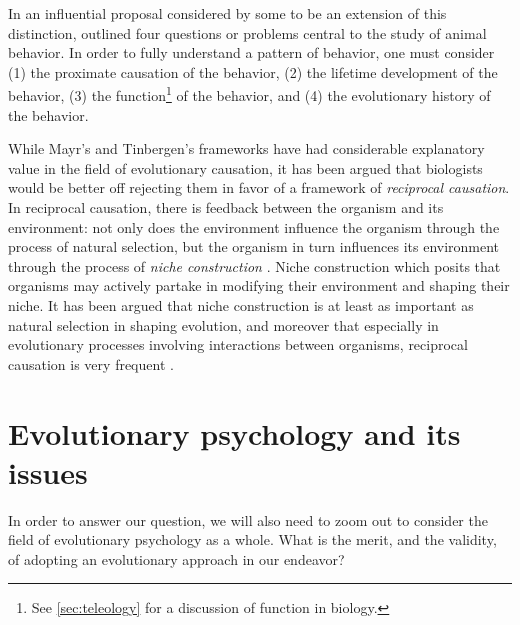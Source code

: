 In an influential proposal considered by some to be an extension of this distinction, \citet{Tinbergen63} outlined four questions or problems central to the study of animal behavior. In order to fully understand a pattern of behavior, one must consider (1) the proximate causation of the behavior, (2) the lifetime development of the behavior, (3) the function\footnote{See \cref{sec:teleology} for a discussion of function in biology.} of the behavior, and (4) the evolutionary history of the behavior.

While Mayr's and Tinbergen's frameworks have had considerable explanatory value in the field of evolutionary causation, it has been argued \citep{Laland13} that biologists would be better off rejecting them in favor of a framework of \emph{reciprocal causation}.
In reciprocal causation, there is feedback between the organism and its environment: not only does the environment influence the organism through the process of natural selection, but the organism in turn influences its environment through the process of \emph{niche construction} \citep{Svensson18}.
Niche construction which posits that organisms may actively partake in modifying their environment and shaping their niche. It has been argued that niche construction is at least as important as natural selection in shaping evolution, and moreover that especially in evolutionary processes involving interactions between organisms, reciprocal causation is very frequent \citep{Svensson18}.

\section{Evolutionary psychology and its issues}

In order to answer our question, we will also need to zoom out to consider the field of evolutionary psychology as a whole. What is the merit, and the validity, of adopting an evolutionary approach in our endeavor?

